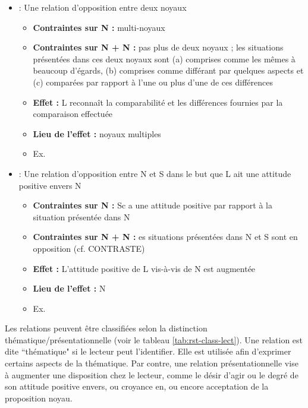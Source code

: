 \documentclass{KodeBook}
\begin{document}
\begin{itemize}
	\item {} :  Une relation d'opposition entre deux noyaux
	\begin{itemize}
		\item \textbf{Contraintes sur N :} multi-noyaux
		\item \textbf{Contraintes sur N + N :} pas plus de deux noyaux ; les situations présentées dans ces deux noyaux sont (a) comprises comme les mêmes à beaucoup d'égards, (b) comprises comme différant par quelques aspects et (c) comparées par rapport à l'une ou plus d'une de ces différences
		\item \textbf{Effet :}  L reconnaît la comparabilité et les différences fournies par la comparaison effectuée
		\item \textbf{Lieu de l'effet :} noyaux multiples
		\item Ex. 
	\end{itemize}

	\item {} :  Une relation d'opposition entre N et S dans le but que L ait une attitude positive envers N
	\begin{itemize}
		\item \textbf{Contraintes sur N :} Sc a une attitude positive par rapport à la situation présentée dans N
		\item \textbf{Contraintes sur N + N :} es situations présentées dans N et S sont en opposition (cf. CONTRASTE)
		\item \textbf{Effet :}  L'attitude positive de L vis-à-vis de N est augmentée
		\item \textbf{Lieu de l'effet :} N
		\item Ex. 
	\end{itemize}
\end{itemize}

Les relations  peuvent être classifiées selon la distinction thématique/présentationnelle (voir le tableau \ref{tab:rst-class-lect}). 
Une relation est dite ``thématique" si le lecteur peut l'identifier.
Elle est utilisée afin d'exprimer certains aspects de la thématique. 
Par contre, une  relation présentationnelle vise à augmenter une disposition chez le lecteur, comme le désir d'agir ou le degré de son attitude positive envers, ou croyance en, ou encore acceptation de la proposition noyau. 
\end{document}
